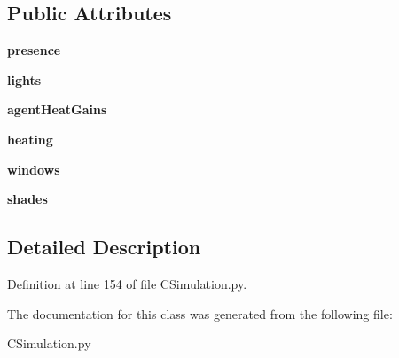 \subsection*{Public Attributes}
\begin{DoxyCompactItemize}
\item 
\mbox{\label{class_c_simulation_1_1_simulation_1_1_no_m_a_s_s_models_aff626664e93a8cb2aea6c0c33dbe72e9}} 
{\bfseries presence}
\item 
\mbox{\label{class_c_simulation_1_1_simulation_1_1_no_m_a_s_s_models_a9364632a9ecc72c4ccec5a0db539657d}} 
{\bfseries lights}
\item 
\mbox{\label{class_c_simulation_1_1_simulation_1_1_no_m_a_s_s_models_a099868ea758a9772c632b7883992a656}} 
{\bfseries agent\+Heat\+Gains}
\item 
\mbox{\label{class_c_simulation_1_1_simulation_1_1_no_m_a_s_s_models_afdb59a198434ba9fafeaea8a401498d1}} 
{\bfseries heating}
\item 
\mbox{\label{class_c_simulation_1_1_simulation_1_1_no_m_a_s_s_models_a836fa8579b25f4eb7c5b634cee3d6a54}} 
{\bfseries windows}
\item 
\mbox{\label{class_c_simulation_1_1_simulation_1_1_no_m_a_s_s_models_a96ff58a0d53420486f2da9f07122e085}} 
{\bfseries shades}
\end{DoxyCompactItemize}


\subsection{Detailed Description}


Definition at line 154 of file C\+Simulation.\+py.



The documentation for this class was generated from the following file\+:\begin{DoxyCompactItemize}
\item 
C\+Simulation.\+py\end{DoxyCompactItemize}

